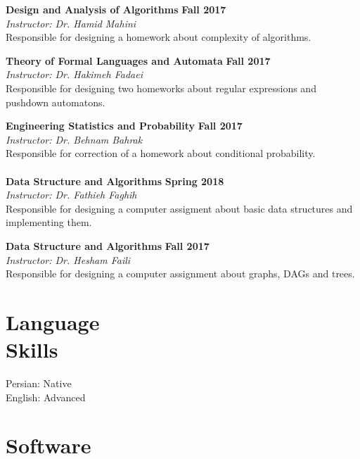 \documentclass[line, mm]{sampleCV}
\begin{document}
\begin{resume}
\textbf{Design and Analysis of Algorithms} \hfill \textbf{Fall 2017}\\
{\it Instructor:  Dr. Hamid Mahini}\\
Responsible for designing a homework about complexity of  algorithms.

\textbf{Theory of Formal Languages and Automata} \hfill \textbf{Fall 2017}\\
{\it Instructor:  Dr. Hakimeh Fadaei}\\ 
Responsible for designing two homeworks about regular expressions and pushdown automatons.

\textbf{Engineering Statistics and Probability} \hfill \textbf{Fall 2017}\\
{\it Instructor:  Dr. Behnam Bahrak}\\
Responsible for correction of a homework about conditional probability. \\ \\
\textbf{Data Structure and Algorithms} \hfill \textbf{Spring 2018}\\
{\it Instructor:  Dr. Fathieh Faghih}\\
Responsible for designing a computer assigment about basic data structures and implementing them.

\textbf{Data Structure and Algorithms} \hfill \textbf{Fall 2017}\\
{\it Instructor:  Dr. Hesham Faili}\\
Responsible for designing a computer assignment about graphs, DAGs and trees.



    \section{\mysidestyle Language\\Skills}
Persian: Native\\
English: Advanced\\

    \section{\mysidestyle Software}


\end{resume}
\end{document}
